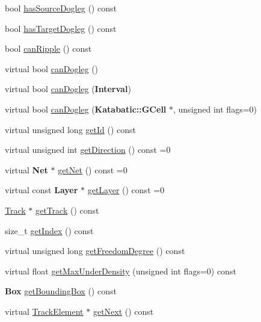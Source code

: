 \begin{DoxyCompactItemize}
bool \hyperlink{classKite_1_1TrackElement_af5f88959753a39f16726a858ee6fb0fd}{has\-Source\-Dogleg} () const 
\item 
bool \hyperlink{classKite_1_1TrackElement_a71fcabadfc78d0e1aefa934659cb1204}{has\-Target\-Dogleg} () const 
\item 
bool \hyperlink{classKite_1_1TrackElement_a5aa65e9913c7368130b187464404ded6}{can\-Ripple} () const 
\item 
virtual bool \hyperlink{classKite_1_1TrackElement_aa0bb6f1592688e942ff67e0ac318a4fd}{can\-Dogleg} ()
\item 
virtual bool \hyperlink{classKite_1_1TrackElement_accb4c6a7ee2678a0cff4dbc4a7860fe1}{can\-Dogleg} ({\bf Interval})
\item 
virtual bool \hyperlink{classKite_1_1TrackElement_a4f040cf33009e4886d401115c3bea838}{can\-Dogleg} ({\bf Katabatic\-::\-G\-Cell} $\ast$, unsigned int flags=0)
\item 
virtual unsigned long \hyperlink{classKite_1_1TrackElement_ae68c47fdf838be02cbf6660cd25a0806}{get\-Id} () const 
\item 
virtual unsigned int \hyperlink{classKite_1_1TrackElement_ae35b78590ed6aa546b626ef95f28c533}{get\-Direction} () const =0
\item 
virtual {\bf Net} $\ast$ \hyperlink{classKite_1_1TrackElement_a2b383a5b6f5028911a35e446a682dabd}{get\-Net} () const =0
\item 
virtual const {\bf Layer} $\ast$ \hyperlink{classKite_1_1TrackElement_ad96c66549598873bf68c2e18ec7164c1}{get\-Layer} () const =0
\item 
\hyperlink{classKite_1_1Track}{Track} $\ast$ \hyperlink{classKite_1_1TrackElement_abfd8de286baf41eea066220773c7046d}{get\-Track} () const 
\item 
size\-\_\-t \hyperlink{classKite_1_1TrackElement_a659e8df65f89db5547aa8a8fe3d92f69}{get\-Index} () const 
\item 
virtual unsigned long \hyperlink{classKite_1_1TrackElement_a9f20f94d2d8aaa38c2b9ead5275ead27}{get\-Freedom\-Degree} () const 
\item 
virtual float \hyperlink{classKite_1_1TrackElement_a71b29fb20a3ba09616a6be4b122a797e}{get\-Max\-Under\-Density} (unsigned int flags=0) const 
\item 
{\bf Box} \hyperlink{classKite_1_1TrackElement_a3b9694bf093e3ea16e4a8c8126a8d4db}{get\-Bounding\-Box} () const 
\item 
virtual \hyperlink{classKite_1_1TrackElement}{Track\-Element} $\ast$ \hyperlink{classKite_1_1TrackElement_a5af0ac91c558873fea9703e7ab6f48df}{get\-Next} () const 

\end{DoxyCompactItemize}
